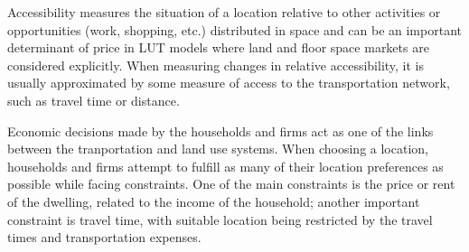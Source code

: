 Accessibility measures the situation of a location relative to other activities or opportunities (work, shopping, etc.) distributed in space and can be an important determinant of price in LUT models where land and floor space markets are considered explicitly\cite{Iacono2008}.
When measuring changes in relative accessibility, it is usually approximated by some measure of access to the transportation network, such as travel time or distance.

Economic decisions made by the households and firms act as one of the links between the tranportation and land use systems.
When choosing a location, households and firms attempt to fulfill as many of their location preferences as possible while facing constraints.
One of the main constraints is the price or rent of the dwelling, related to the income of the household;
another important constraint is travel time, with suitable location being restricted by the travel times and transportation expenses\cite{Moeckel2017}.
